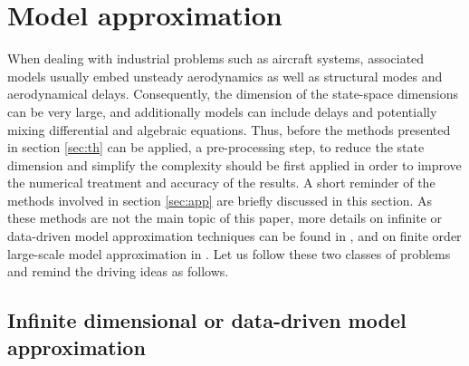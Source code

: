 \documentclass[graybox]{svmult}
\begin{document}
\section{Model approximation}\label{sec:mr}

When dealing with industrial problems such as aircraft systems, associated models usually embed unsteady aerodynamics as well as structural modes and aerodynamical delays. Consequently, the dimension of the  state-space dimensions can be very large, and additionally models can include delays and potentially mixing differential and algebraic equations. Thus, before the methods presented in section \ref{sec:th} can be applied, a pre-processing step, to reduce the state dimension and simplify the complexity should be first applied in order to improve the numerical treatment and accuracy of the results. A short reminder of the methods involved in section \ref{sec:app} are briefly discussed in this section. As these methods are not the main topic of this paper, more details on infinite or data-driven model approximation techniques can be found in \cite{AntoulasSurvey:2016,DalmasECC:2016,Meyer:2016}, and on finite order large-scale model approximation in \cite{AntoulasBook:2005,GugercinSIAM:2008}.  Let us follow these two classes of problems and remind the driving ideas as follows.

\subsection{Infinite  dimensional or data-driven model approximation}\label{sec:app_a}
\end{document}
